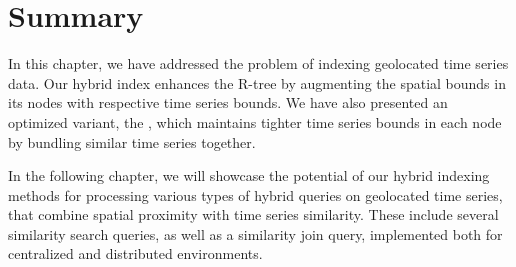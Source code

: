 
\graphicspath{{Papers/SIGSpatial2017/}{Papers/SIGSpatial2018/}}

\section{Summary}
\label{sec:concl_btsr}

In this chapter, we have addressed the problem of indexing geolocated time series data. Our hybrid \tsr index enhances the R-tree by augmenting the spatial bounds in its nodes with respective time series bounds. We have also presented an optimized variant, the \btsr, which maintains tighter time series bounds in each node by bundling similar time series together.

In the following chapter, we will showcase the potential of our hybrid indexing methods for processing various types of hybrid queries on geolocated time series, that combine spatial proximity with time series similarity. These include several similarity search queries, as well as a similarity join query, implemented both for centralized and distributed environments.